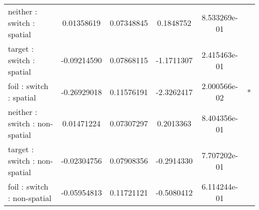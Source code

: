 \begin{center}
\begin{longtable}{l S[table-format=>1.2] S[table-format=1.3] S[table-format=>1.2] S[round-precision=3,round-minimum=0.001,table-format=>1.3] c }
neither : switch : spatial          &   0.01358619 &             0.07348845 &                    0.1848752 &            8.533269e-01 &         \\
 target : switch : spatial          &  -0.09214590 &             0.07868115 &                   -1.1711307 &            2.415463e-01 &         \\
   foil : switch : spatial          &  -0.26929018 &             0.11576191 &                   -2.3262417 &            2.000566e-02 &       * \\
neither : switch : non-spatial      &   0.01471224 &             0.07307297 &                    0.2013363 &            8.404356e-01 &         \\
 target : switch : non-spatial      &  -0.02304756 &             0.07908356 &                   -0.2914330 &            7.707202e-01 &         \\
   foil : switch : non-spatial      &  -0.05954813 &             0.11721121 &                   -0.5080412 &            6.114244e-01 &         \\ \bottomrule

\end{longtable}
\end{center}
